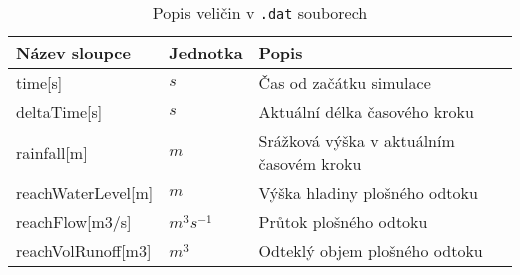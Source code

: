 


\begin{table}[t]
 

 \centering
 \caption{Popis veličin  v {\tt.dat} souborech}
\label{tab:vystupytokdat}

 \begin{tabular}{llp{}}
  \hline  \hline
 Název sloupce        & Jednotka     & Popis                                      \\ 
 \hline
 time[s]              &   $s$              &  Čas od začátku simulace                   \\
 deltaTime[s]         &   $s$              &  Aktuální délka časového kroku            \\
 rainfall[m]          &  $m$               &  Srážková výška v aktuálním časovém kroku \\
 reachWaterLevel[m]        &  $m$          &  Výška hladiny plošného odtoku            \\
 reachFlow[m3/s]              &  $m^3s^{-1}$   &  Průtok plošného odtoku                   \\
 reachVolRunoff[m3]           &  $m^3$         & Odteklý objem plošného odtoku     \\
  \hline
 \end{tabular}

\end{table}

% 
% 
